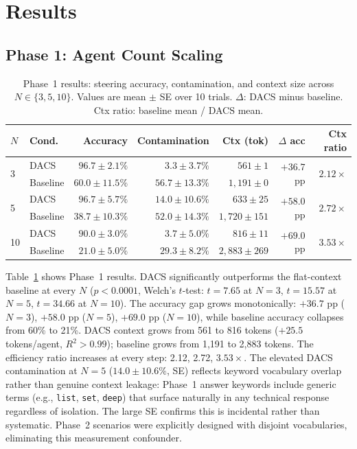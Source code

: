 \documentclass{article}
\begin{document}
\section{Results}
\label{sec:results}

\subsection{Phase 1: Agent Count Scaling}

\begin{table}[t]
\caption{Phase~1 results: steering accuracy, contamination, and context
size across $N \in \{3,5,10\}$.
Values are mean $\pm$ SE over 10 trials.
$\Delta$: DACS minus baseline.
Ctx ratio: baseline mean / DACS mean.}
\label{tab:phase1}
\centering
\small
\begin{tabular}{llrrrrr}
\toprule
$N$ & Cond. & Accuracy & Contamination & Ctx (tok) & $\Delta$ acc & Ctx ratio \\
\midrule
\multirow{2}{*}{3}
  & DACS     & $96.7\pm2.1\%$ & $3.3\pm3.7\%$  & $561\pm1$   & \multirow{2}{*}{$+36.7$pp} & \multirow{2}{*}{$2.12\times$} \\
  & Baseline & $60.0\pm11.5\%$ & $56.7\pm13.3\%$ & $1{,}191\pm0$ & & \\[4pt]
\multirow{2}{*}{5}
  & DACS     & $96.7\pm5.7\%$ & $14.0\pm10.6\%$ & $633\pm25$  & \multirow{2}{*}{$+58.0$pp} & \multirow{2}{*}{$2.72\times$} \\
  & Baseline & $38.7\pm10.3\%$ & $52.0\pm14.3\%$ & $1{,}720\pm151$ & & \\[4pt]
\multirow{2}{*}{10}
  & DACS     & $90.0\pm3.0\%$ & $3.7\pm5.0\%$  & $816\pm11$  & \multirow{2}{*}{$+69.0$pp} & \multirow{2}{*}{$3.53\times$} \\
  & Baseline & $21.0\pm5.0\%$ & $29.3\pm8.2\%$ & $2{,}883\pm269$ & & \\
\bottomrule
\end{tabular}
\end{table}

Table~\ref{tab:phase1} shows Phase~1 results.
DACS significantly outperforms the flat-context baseline at every $N$
($p < 0.0001$, Welch's $t$-test: $t=7.65$ at $N=3$, $t=15.57$ at
$N=5$, $t=34.66$ at $N=10$).
The accuracy gap grows monotonically: $+36.7$ pp ($N=3$), $+58.0$ pp
($N=5$), $+69.0$ pp ($N=10$), while baseline accuracy collapses from
60\% to 21\%.
DACS context grows from 561 to 816 tokens ($+25.5$ tokens/agent,
$R^2>0.99$); baseline grows from 1{,}191 to 2{,}883 tokens.
The efficiency ratio increases at every step: 2.12, 2.72, $3.53\times$.
The elevated DACS contamination at $N=5$ ($14.0\pm10.6\%$, SE) reflects
keyword vocabulary overlap rather than genuine context leakage: Phase~1
answer keywords include generic terms (e.g., \texttt{list}, \texttt{set},
\texttt{deep}) that surface naturally in any technical response regardless
of isolation.
The large SE confirms this is incidental rather than systematic.
Phase~2 scenarios were explicitly designed with disjoint vocabularies,
eliminating this measurement confounder.
\end{document}
